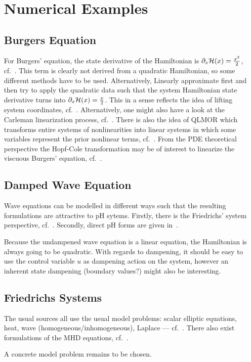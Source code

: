 \section{Numerical Examples}

\subsection{Burgers Equation}

For Burgers' equation, the state derivative of the Hamiltonian is $\partial_{x} \mathcal{H}(x) = \frac{x^2}{2}$, cf.~\cite{Maschke2005}.
This term is clearly not derived from a quadratic Hamiltonian, so some different methods have to be used.
Alternatively, Linearly approximate first and then try to apply the quadratic data such that the system Hamiltonian state derivative turns into $\partial_{x} \mathcal{H}(x) = \frac{x}{2}$.
This in a sense reflects the idea of lifting system coordinates, cf.~\cite{Qian2020, Kramer2019}.
Alternatively, one might also have a look at the Carleman linearization process, cf.~\cite{Goyal2015, Rugh1981}.
There is also the idea of QLMOR which transforms entire systems of nonlinearities into linear systems in which some variables represent the prior nonlinear terms, cf.~\cite{Gu2011}.
From the PDE theoretical perspective the Hopf-Cole transformation may be of interest to linearize the viscuous Burgers' equation, cf.~\cite{Hopf1950, Cole1951, Kannan2012, Chen2016}.

\subsection{Damped Wave Equation}

Wave equations can be modelled in different ways such that the resulting formulations are attractive to pH sytems.
Firstly, there is the Friedrichs' system perspective, cf.~\cite{Friedrichs1958, Antonic2014, Mifsud2016}.
Secondly, direct pH forms are given in~\cite{Cardoso2018, Serhani2019}.

Because the undampened wave equation is a linear equation, the Hamiltonian is always going to be quadratic.
With regards to dampening, it should be easy to use the control variable $u$ as dampening action on the system, however an inherent state dampening (boundary values?) might also be interesting.

\subsection{Friedrichs Systems}

The usual sources all use the usual model problems: scalar elliptic equations, heat, wave (homogeneous/inhomogeneous), Laplace --- cf.~\cite{Friedrichs1958, Burman2010, Antonic2013, Antonic2014, Mifsud2016, Erceg2022}.
There also exist formulations of the MHD equations, cf.~\cite{Ern2006}.

A concrete model problem remains to be chosen.
